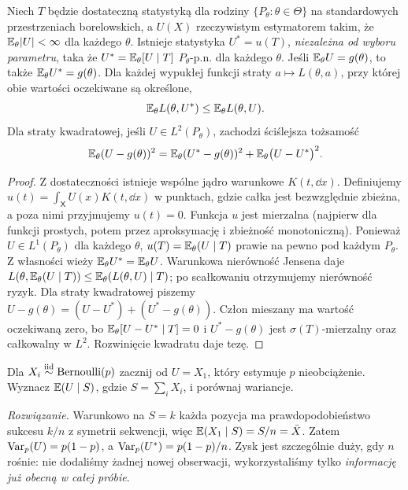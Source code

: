 \begin{twierdzenie}\label{thm:rao-blackwell}
Niech $T$ będzie dostateczną statystyką dla rodziny
$\{P_\theta:\theta\in\Theta\}$ na standardowych przestrzeniach
borelowskich, a $U(X)$ rzeczywistym estymatorem takim, że
$\mathbb E_\theta|U|<\infty$ dla każdego $\theta$. Istnieje statystyka
$U^*=u(T)$, \emph{niezależna od wyboru parametru}, taka że
$U^*=\mathbb E_\theta[U\mid T]$ $P_\theta$-p.n. dla każdego $\theta$.
Jeśli $\mathbb E_\theta U=g(\theta)$, to także
$\mathbb E_\theta U^*=g(\theta)$.
Dla każdej wypukłej funkcji straty $a\mapsto L(\theta,a)$,
przy której obie wartości oczekiwane są określone,
\[
\mathbb E_\theta L(\theta,U^*)\le\mathbb E_\theta L(\theta,U).
\]
Dla straty kwadratowej, jeśli $U\in L^2(P_\theta)$, zachodzi
ściślejsza tożsamość
\[
\mathbb E_\theta(U-g(\theta))^2
=\mathbb E_\theta(U^*-g(\theta))^2
 +\mathbb E_\theta\bigl(U-U^*\bigr)^2.
\]
\end{twierdzenie}
\begin{proof}
Z dostateczności istnieje wspólne jądro warunkowe $K(t,\dd x)$.
Definiujemy $u(t)=\int_{\mathsf X}U(x)K(t,\dd x)$ w punktach, gdzie całka
jest bezwzględnie zbieżna, a poza nimi przyjmujemy $u(t)=0$.
Funkcja $u$ jest mierzalna (najpierw dla funkcji prostych,
potem przez aproksymację i zbieżność monotoniczną).
Ponieważ $U\in L^1(P_\theta)$ dla każdego $\theta$,
$u(T)=\mathbb E_\theta(U\mid T)$ prawie na pewno pod każdym $P_\theta$.
Z własności wieży $\mathbb E_\theta U^*=\mathbb E_\theta U$.
Warunkowa nierówność Jensena daje
$L(\theta,\mathbb E_\theta(U\mid T))\le
\mathbb E_\theta(L(\theta,U)\mid T)$;
po scałkowaniu otrzymujemy nierówność ryzyk.
Dla straty kwadratowej piszemy
$U-g(\theta)=(U-U^*)+(U^*-g(\theta))$.
Człon mieszany ma wartość oczekiwaną zero, bo
$\mathbb E_\theta[U-U^*\mid T]=0$ i $U^*-g(\theta)$ jest
$\sigma(T)$-mierzalny oraz całkowalny w $L^2$.
Rozwinięcie kwadratu daje tezę.
\end{proof}

\begin{zadanie}
Dla $X_i\mathrel{\overset{\mathrm{iid}}\sim}\operatorname{Bernoulli}(p)$ zacznij od
$U=X_1$, który estymuje $p$ nieobciążenie.
Wyznacz $\mathbb E(U\mid S)$, gdzie $S=\sum_iX_i$, i porównaj wariancje.
\par\emph{Rozwiązanie.} Warunkowo na $S=k$ każda pozycja
ma prawdopodobieństwo sukcesu $k/n$ z symetrii sekwencji,
więc $\mathbb E(X_1\mid S)=S/n=\bar X$.
Zatem $\operatorname{Var}_p(U)=p(1-p)$,
a $\operatorname{Var}_p(U^*)=p(1-p)/n$.
Zysk jest szczególnie duży, gdy $n$ rośnie: nie dodaliśmy
żadnej nowej obserwacji, wykorzystaliśmy tylko \emph{informację
już obecną w całej próbie}.
\end{zadanie}

